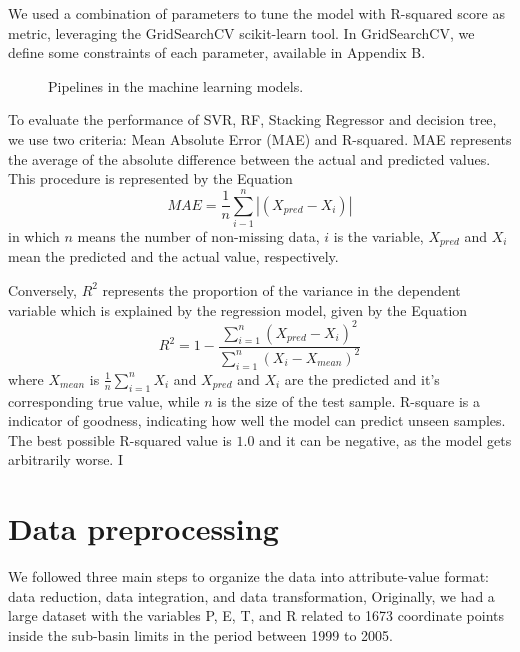 \documentclass[12pt]{article}
\begin{document}
We used a combination of parameters to tune the model with R-squared score as metric, leveraging the GridSearchCV scikit-learn tool. In GridSearchCV, we define some constraints of each parameter, available in Appendix B.

\begin{figure}[htbp]
    \centering
    {\footnotesize}
    \caption{Pipelines in the machine learning models.}
    \label{fig:pipelines}
\end{figure}

To evaluate the performance of SVR, RF, Stacking Regressor and decision tree, we use two criteria: Mean Absolute Error (MAE) and R-squared. MAE represents the average of the absolute difference between the actual and predicted values. This procedure is represented by the Equation
\begin{equation}
    \label{eqn:mae}
    MAE={\frac{1}{n}\sum_{i-1}^{n}|(X_{pred}-X_{i})|}
\end{equation}
in which $n$ means the number of non-missing data, $i$ is the variable, $X_{pred}$ and $X_{i}$ mean the predicted and the actual value, respectively.

Conversely, $R^2$ represents the proportion of the variance in the dependent variable which is explained by the regression model, given by the Equation
\begin{equation}
    \label{eqn:r2}
    R^2={1 - \frac{\sum_{i=1}^{n}(X_{pred}-X_{i})^{2}}{\sum_{i=1}^{n}(X_{i}-X_{mean})^{2}}}
\end{equation}
where $X_{mean}$ is $\frac{1}{n}\sum_{i=1}^{n}X_{i}$ and $X_{pred}$ and $X_{i}$ are the predicted and it's corresponding true value, while $n$ is the size of the test sample. R-square is a indicator of goodness, indicating how well the model can predict unseen samples. The best possible R-squared value is $1.0$ and it can be negative, as the model gets arbitrarily worse. I

\section{Data preprocessing}

We followed three main steps to organize the data into attribute-value format: data reduction, data integration, and data transformation,  Originally, we had a large dataset with the variables P, E, T, and R related to 1673 coordinate points inside the sub-basin limits in the period between 1999 to 2005.
\end{document}
